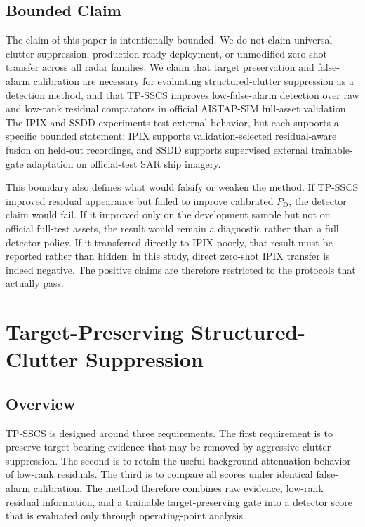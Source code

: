 \documentclass[journal]{IEEEtran}
\begin{document}
\subsection{Bounded Claim}

The claim of this paper is intentionally bounded. We do not claim universal clutter suppression, production-ready deployment, or unmodified zero-shot transfer across all radar families. We claim that target preservation and false-alarm calibration are necessary for evaluating structured-clutter suppression as a detection method, and that TP-SSCS improves low-false-alarm detection over raw and low-rank residual comparators in official AISTAP-SIM full-asset validation. The IPIX and SSDD experiments test external behavior, but each supports a specific bounded statement: IPIX supports validation-selected residual-aware fusion on held-out recordings, and SSDD supports supervised external trainable-gate adaptation on official-test SAR ship imagery.

This boundary also defines what would falsify or weaken the method. If TP-SSCS improved residual appearance but failed to improve calibrated $P_{\mathrm{D}}$, the detector claim would fail. If it improved only on the development sample but not on official full-test assets, the result would remain a diagnostic rather than a full detector policy. If it transferred directly to IPIX poorly, that result must be reported rather than hidden; in this study, direct zero-shot IPIX transfer is indeed negative. The positive claims are therefore restricted to the protocols that actually pass.

\section{Target-Preserving Structured-Clutter Suppression}

\subsection{Overview}

TP-SSCS is designed around three requirements. The first requirement is to preserve target-bearing evidence that may be removed by aggressive clutter suppression. The second is to retain the useful background-attenuation behavior of low-rank residuals. The third is to compare all scores under identical false-alarm calibration. The method therefore combines raw evidence, low-rank residual information, and a trainable target-preserving gate into a detector score that is evaluated only through operating-point analysis.
\end{document}

